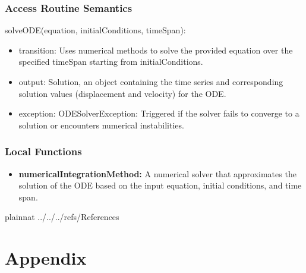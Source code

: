 \documentclass[12pt, titlepage]{article}
\begin{document}
\subsubsection{Access Routine Semantics}

\noindent solveODE(equation, initialConditions, timeSpan):
\begin{itemize}
\item transition: Uses numerical methods to solve the provided equation over the specified timeSpan starting from initialConditions.
\item output: Solution, an object containing the time series and corresponding solution values (displacement and velocity) for the ODE.
\item exception: ODESolverException: Triggered if the solver fails to converge to a solution or encounters numerical instabilities.
\end{itemize}

\subsubsection{Local Functions}

\begin{itemize}
  \item \textbf{numericalIntegrationMethod:} A numerical solver that approximates the solution of the ODE based on the input equation, initial conditions, and time span.
\end{itemize}


\newpage

 {plainnat}
 {../../../refs/References}

\newpage

\section{Appendix} \label{Appendix}
\end{document}
